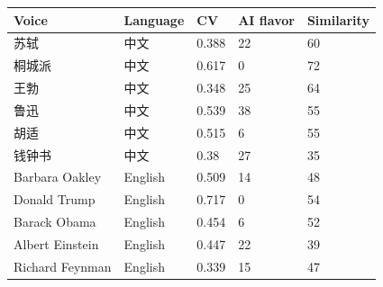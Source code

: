 \begin{longtable}{@{}lllll@{}}
\toprule Voice & Language & CV & AI flavor & Similarity \\
\midrule
苏轼 & 中文 & 0.388 & 22 & 60 \\
桐城派 & 中文 & 0.617 & 0 & 72 \\
王勃 & 中文 & 0.348 & 25 & 64 \\
鲁迅 & 中文 & 0.539 & 38 & 55 \\
胡适 & 中文 & 0.515 & 6 & 55 \\
钱钟书 & 中文 & 0.38 & 27 & 35 \\
Barbara Oakley & English & 0.509 & 14 & 48 \\
Donald Trump & English & 0.717 & 0 & 54 \\
Barack Obama & English & 0.454 & 6 & 52 \\
Albert Einstein & English & 0.447 & 22 & 39 \\
Richard Feynman & English & 0.339 & 15 & 47 \\
\bottomrule
\end{longtable}
